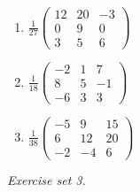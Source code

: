 \begin{enumerate}[label=\arabic*., leftmargin=*, itemsep=1pt]
\item $\frac{1}{27}\left(\begin{smallmatrix}12 & 20 & -3\\ 0 & 9 & 0\\ 3 & 5 & 6\end{smallmatrix}\right)$
\item $\frac{1}{18}\left(\begin{smallmatrix}-2 & 1 & 7\\ 8 & 5 & -1\\ -6 & 3 & 3\end{smallmatrix}\right)$
\item $\frac{1}{38}\left(\begin{smallmatrix}-5 & 9 & 15\\ 6 & 12 & 20\\ -2 & -4 & 6\end{smallmatrix}\right)$
\end{enumerate}
\par\noindent\emph{Exercise set 3.}\nopagebreak
